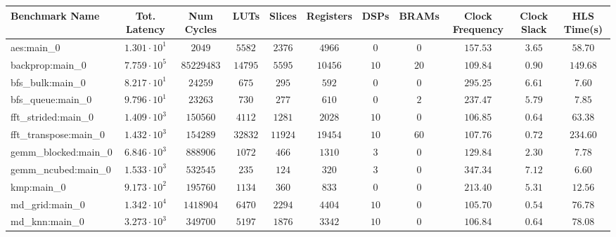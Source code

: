 \begin{tabular}{|l|c|c|c|c|c|c|c|c|c|c|}
\hline
Benchmark Name         & Tot. Latency           & Num Cycles   & LUTs      & Slices    & Registers & DSPs    & BRAMs  & Clock Frequency & Clock Slack & HLS Time(s) \\
\hline
aes:main\_0            & $ 1.301 \cdot 10^{1} $ & $ 2049     $ & $ 5582  $ & $ 2376  $ & $ 4966  $ & $ 0   $ & $ 0  $ & $ 157.53      $ & $ 3.65    $ & $ 58.70   $ \\
backprop:main\_0       & $ 7.759 \cdot 10^{5} $ & $ 85229483 $ & $ 14795 $ & $ 5595  $ & $ 10456 $ & $ 10  $ & $ 20 $ & $ 109.84      $ & $ 0.90    $ & $ 149.68  $ \\
bfs\_bulk:main\_0      & $ 8.217 \cdot 10^{1} $ & $ 24259    $ & $ 675   $ & $ 295   $ & $ 592   $ & $ 0   $ & $ 0  $ & $ 295.25      $ & $ 6.61    $ & $ 7.60    $ \\
bfs\_queue:main\_0     & $ 9.796 \cdot 10^{1} $ & $ 23263    $ & $ 730   $ & $ 277   $ & $ 610   $ & $ 0   $ & $ 2  $ & $ 237.47      $ & $ 5.79    $ & $ 7.85    $ \\
fft\_strided:main\_0   & $ 1.409 \cdot 10^{3} $ & $ 150560   $ & $ 4112  $ & $ 1281  $ & $ 2028  $ & $ 10  $ & $ 0  $ & $ 106.85      $ & $ 0.64    $ & $ 63.38   $ \\
fft\_transpose:main\_0 & $ 1.432 \cdot 10^{3} $ & $ 154289   $ & $ 32832 $ & $ 11924 $ & $ 19454 $ & $ 10  $ & $ 60 $ & $ 107.76      $ & $ 0.72    $ & $ 234.60  $ \\
gemm\_blocked:main\_0  & $ 6.846 \cdot 10^{3} $ & $ 888906   $ & $ 1072  $ & $ 466   $ & $ 1310  $ & $ 3   $ & $ 0  $ & $ 129.84      $ & $ 2.30    $ & $ 7.78    $ \\
gemm\_ncubed:main\_0   & $ 1.533 \cdot 10^{3} $ & $ 532545   $ & $ 235   $ & $ 124   $ & $ 320   $ & $ 3   $ & $ 0  $ & $ 347.34      $ & $ 7.12    $ & $ 6.60    $ \\
kmp:main\_0            & $ 9.173 \cdot 10^{2} $ & $ 195760   $ & $ 1134  $ & $ 360   $ & $ 833   $ & $ 0   $ & $ 0  $ & $ 213.40      $ & $ 5.31    $ & $ 12.56   $ \\
md\_grid:main\_0       & $ 1.342 \cdot 10^{4} $ & $ 1418904  $ & $ 6470  $ & $ 2294  $ & $ 4404  $ & $ 10  $ & $ 0  $ & $ 105.70      $ & $ 0.54    $ & $ 76.78   $ \\
md\_knn:main\_0        & $ 3.273 \cdot 10^{3} $ & $ 349700   $ & $ 5197  $ & $ 1876  $ & $ 3342  $ & $ 10  $ & $ 0  $ & $ 106.84      $ & $ 0.64    $ & $ 78.08   $ \\

\end{tabular}
